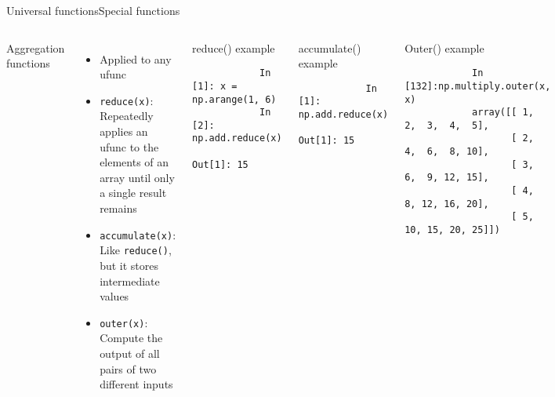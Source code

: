 \documentclass[10pt,compress]{beamer} %
\begin{document}
\begin{frame}[fragile]{Universal functions}{Special functions}
	\vspace{-0.2cm} 
	\begin{columns}
			Aggregation functions
			\begin{itemize}
				\item Applied to any ufunc
				\item \texttt{reduce(x)}: Repeatedly applies an ufunc to the elements of an array until only a single result remains
				\item \texttt{accumulate(x)}: Like \texttt{reduce()}, but it stores intermediate values
				\item \texttt{outer(x)}: Compute the output of all pairs of two different inputs
			\end{itemize}

		\begin{exampleblock}{\footnotesize{reduce() example}}
		\vspace{-0.2cm} 
			\begin{lstlisting}
			In [1]: x = np.arange(1, 6)
			In [2]: np.add.reduce(x)
			Out[1]: 15
			\end{lstlisting}
		\vspace{-0.2cm} 
		\end{exampleblock}

		\begin{exampleblock}{\footnotesize{accumulate() example}}
		\vspace{-0.2cm} 
			\begin{lstlisting}
			In [1]: np.add.reduce(x)
			Out[1]: 15
			\end{lstlisting}
		\vspace{-0.2cm} 
		\end{exampleblock}

		\begin{exampleblock}{\footnotesize{Outer() example}}
		\vspace{-0.2cm} 
			\begin{lstlisting}
			In [132]:np.multiply.outer(x, x)
			array([[ 1,  2,  3,  4,  5], 
			       [ 2,  4,  6,  8, 10], 
			       [ 3,  6,  9, 12, 15], 
			       [ 4,  8, 12, 16, 20], 
			       [ 5, 10, 15, 20, 25]])
			\end{lstlisting}
		\vspace{-0.2cm} 
		\end{exampleblock}
	\end{columns}
\end{frame}
\end{document}
